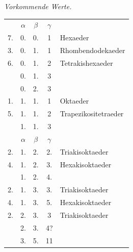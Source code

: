 \begin{center}\emph{Vorkommende Werte.}\end{center}
\begin{center}
\begin{tabular}{rccc l}
&$\alpha$&$\beta$&$\gamma$&\\
7.&0.&0.&1&Hexaeder\\
3.&0.&1.&1&Rhombendodekaeder\\
6.&0.&1.&2&Tetrakishexaeder\\
&0.&1.&3&\\
&0.&2.&3&\\
1.&1.&1.&1&Oktaeder\\
5.&1.&1.&2&Trapezikositetraeder\\
&1.&1.&3&\\[1.2ex]
&$\alpha$&$\beta$&$\gamma$&\\
2.&1.&2.&2.&Triakisoktaeder\\
4.&1.&2.&3.&Hexakisoktaeder\\
&1.&2.&4.&\\
2.&1.&3.&3.&Triakisoktaeder\\
4.&1.&3.&5.&Hexakisoktaeder\\
2.&2.&3.&3&Triakisoktaeder\\
&2.&3.&4?&\\
&3.&5.&11&
\end{tabular}
\end{center}


